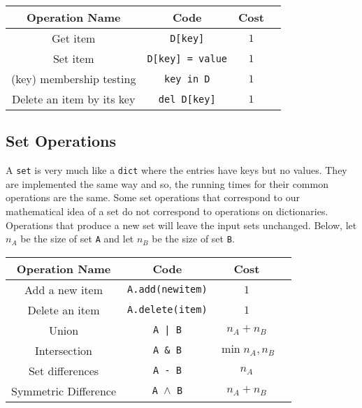 \begin{tabular}{c c c c}

\hline


Operation Name & 
Code & 
Cost & 
\\
\hline



Get item &
\texttt{D[key]} &
$1$ &
\\

Set item &
\texttt{D[key] = value} &
$1$ &
\\

(key) membership testing &
\texttt{key in D} &
$1$ &
\\

Delete an item by its key &
\texttt{del D[key]} &
$1$ &
\\
\hline
\end{tabular}
\subsection{Set Operations}


A \texttt{set} is very much like a \texttt{dict} where the entries have keys but no values.
They are implemented the same way and so, the running times for their common operations are the same.
Some set operations that correspond to our mathematical idea of a set do not correspond to operations on dictionaries.
Operations that produce a new set will leave the input sets unchanged.
Below, let $n_A$ be the size of set \texttt{A} and let $n_B$ be the size of set \texttt{B}.

\begin{tabular}{c c c c}

\hline


Operation Name & 
Code & 
Cost & 
\\
\hline



Add a new item &
\texttt{A.add(newitem)} &
$1$ &
\\

Delete an item &
\texttt{A.delete(item)} &
$1$ &
\\

Union &
\texttt{A | B} &
$n_A + n_B$ &
\\

Intersection &
\texttt{A \& B} &
$\min{n_A, n_B}$ &
\\

Set differences &
\texttt{A - B} &
$n_A$ &
\\

Symmetric Difference &
\texttt{A \ensuremath{\wedge} B} &
$n_A + n_B$ &
\\
\hline
\end{tabular}
